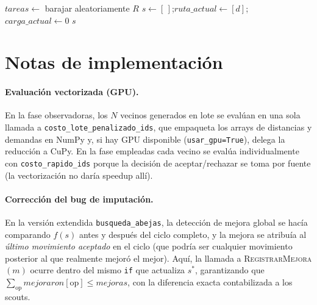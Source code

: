 \documentclass[12pt, a4paper]{article}
\begin{document}
\begin{algorithm}[H]
\DontPrintSemicolon
\caption{Generación de solución aleatoria para scouts}
\label{alg:solucion_aleatoria}


\BlankLine
$\mathit{tareas} \leftarrow$ barajar aleatoriamente $R$ \;
$s \leftarrow [\,]$;\quad $\mathit{ruta\_actual} \leftarrow [d]$;\quad
$\mathit{carga\_actual} \leftarrow 0$ \;
\Return $s$
\end{algorithm}

\section{Notas de implementación}

\paragraph{Evaluación vectorizada (GPU).}
En la fase observadoras, los $N$ vecinos generados en lote se evalúan en una
sola llamada a \texttt{costo\_lote\_penalizado\_ids}, que empaqueta los arrays
de distancias y demandas en NumPy y, si hay GPU disponible (\texttt{usar\_gpu=True}),
delega la reducción a CuPy. En la fase empleadas cada vecino se evalúa
individualmente con \texttt{costo\_rapido\_ids} porque la decisión de
aceptar/rechazar se toma por fuente (la vectorización no daría speedup allí).

\paragraph{Corrección del bug de imputación.}
En la versión extendida \texttt{busqueda\_abejas}, la detección de mejora global
se hacía comparando $f(s)$ antes y después del ciclo completo, y la mejora se
atribuía al \emph{último movimiento aceptado} en el ciclo (que podría ser
cualquier movimiento posterior al que realmente mejoró el mejor). Aquí, la
llamada a \textsc{RegistrarMejora}$(m)$ ocurre dentro del mismo \texttt{if}
que actualiza $s^{*}$, garantizando que $\sum_{\mathrm{op}}\mathit{mejoraron}[\mathrm{op}]
\leq \mathit{mejoras}$, con la diferencia exacta contabilizada a los scouts.
\end{document}
